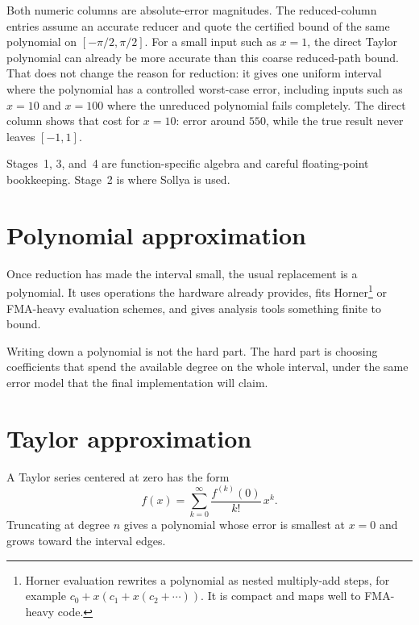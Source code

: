 \documentclass[manuscript, nonacm]{acmart}
\begin{document}
    Both numeric columns are absolute-error magnitudes. The reduced-column
    entries assume an accurate reducer and quote the certified bound of the same
    polynomial on $[-\pi/2, \pi/2]$. For a small input such as $x = 1$, the direct
    Taylor polynomial can already be more accurate than this coarse reduced-path
    bound. That does not change the reason for reduction: it gives one uniform
    interval where the polynomial has a controlled worst-case error, including
    inputs such as $x = 10$ and $x = 100$ where the unreduced polynomial fails
    completely. The direct column shows that cost for $x = 10$: error around
    $550$, while the true result never leaves $[-1, 1]$.

    Stages~1, 3, and~4 are function-specific algebra and careful
    floating-point bookkeeping. Stage~2 is where Sollya is used.



    \section{Polynomial approximation}

    Once reduction has made the interval small, the usual replacement is a
    polynomial. It uses operations the hardware already provides, fits Horner\footnote{Horner evaluation rewrites a polynomial as nested multiply-add steps, for example $c_0 + x(c_1 + x(c_2 + \cdots))$. It is compact and maps well to FMA-heavy code.} or
    FMA-heavy evaluation schemes, and gives analysis tools something finite to
    bound.

    Writing down a polynomial is not the hard part. The hard part is choosing
    coefficients that spend the available degree on the whole interval, under the
    same error model that the final implementation will claim.



    \section{Taylor approximation}

    A Taylor series centered at zero has the form
    \[
        f(x) = \sum_{k=0}^{\infty} \frac{f^{(k)}(0)}{k!}\, x^k.
    \]
    Truncating at degree $n$ gives a polynomial whose error is smallest at $x = 0$
    and grows toward the interval edges.
\end{document}
